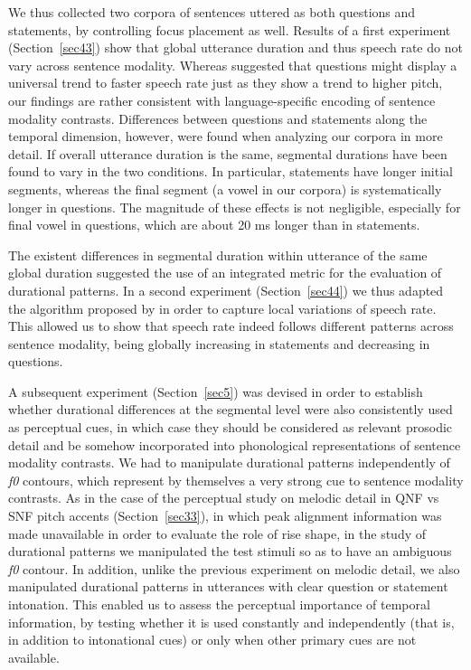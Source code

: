 We thus collected two corpora of sentences uttered as both questions and statements, by controlling focus placement as well. Results of a first experiment (Section~\ref{sec43}) show that global utterance duration and thus speech rate do not vary across sentence modality. Whereas \citet{vanheuven2005speech} suggested that questions might display a universal trend to faster speech rate just as they show a trend to higher pitch, our findings are rather consistent with language-specific encoding of sentence modality contrasts. Differences between questions and statements along the temporal dimension, however, were found when analyzing our corpora in more detail. If overall utterance duration is the same, segmental durations have been found to vary in the two conditions. In particular, statements have longer initial segments, whereas the final segment (a vowel in our corpora) is systematically longer in questions. The magnitude of these effects is not negligible, especially for final vowel in questions, which are about 20 ms longer than in statements. 

The existent differences in segmental duration within utterance of the same global duration suggested the use of an integrated metric for the evaluation of durational patterns. In a second experiment (Section~\ref{sec44}) we thus adapted the algorithm proposed by \citet{pfitzinger2001phonetische} in order to capture local variations of speech rate. This allowed us to show that speech rate indeed follows different patterns across sentence modality, being globally increasing in statements and decreasing in questions.

A subsequent experiment (Section~\ref{sec5}) was devised in order to establish whether durational differences at the segmental level were also consistently used as perceptual cues, in which case they should be considered as relevant prosodic detail and be somehow incorporated into phonological representations of sentence modality contrasts. We had to manipulate durational patterns independently of \textit{f0} contours, which represent by themselves a very strong cue to sentence modality contrasts. As in the case of the perceptual study on melodic detail in QNF vs SNF pitch accents (Section~\ref{sec33}), in which peak alignment information was made unavailable in order to evaluate the role of rise shape, in the study of durational patterns we manipulated the test stimuli so as to have an ambiguous \textit{f0} contour. In addition, unlike the previous experiment on melodic detail, we also manipulated durational patterns in utterances with clear question or statement intonation. This enabled us to assess the perceptual importance of temporal information, by testing whether it is used constantly and independently (that is, in addition to intonational cues) or only when other primary cues are not available. 


